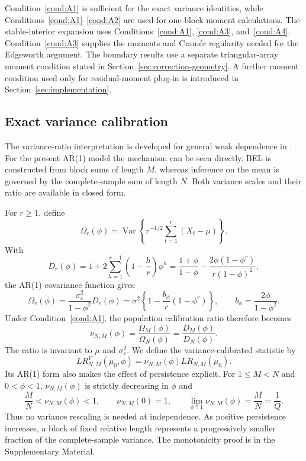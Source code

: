 \documentclass[12pt]{article}
\theoremstyle{remark}
\begin{document}
Condition~\ref{cond:A1} is sufficient for the exact variance identities, while Conditions~\ref{cond:A1}--\ref{cond:A2} are used for one-block moment calculations. The stable-interior expansion uses Conditions~\ref{cond:A1}, \ref{cond:A3}, and~\ref{cond:A4}. Condition~\ref{cond:A3} supplies the moments and Cram\'er regularity needed for the Edgeworth argument. The boundary results use a separate triangular-array moment condition stated in Section~\ref{sec:correction-geometry}. A further moment condition used only for residual-moment plug-in is introduced in Section~\ref{sec:implementation}.

\subsection{Exact variance calibration}
\label{sec:exact-vc}

The variance-ratio interpretation is developed for general weak dependence in \citet{Alksnis.Valeinis:2026}. For the present AR(1) model the mechanism can be seen directly. BEL is constructed from block sums of length $M$, whereas inference on the mean is governed by the complete-sample sum of length $N$. Both variance scales and their ratio are available in closed form.

For $r\ge1$, define
\[
\Omega_r(\phi)
=\operatorname{Var}\left\{r^{-1/2}\sum_{t=1}^r(X_t-\mu)\right\}.
\]
With
\[
D_r(\phi)
=1+2\sum_{h=1}^{r-1}\left(1-\frac{h}{r}\right)\phi^h
=\frac{1+\phi}{1-\phi}
-\frac{2\phi(1-\phi^r)}{r(1-\phi)^2},
\]
the AR(1) covariance function gives
\begin{equation}
\Omega_r(\phi)
=\frac{\sigma_\varepsilon^2}{1-\phi^2}D_r(\phi)
=\sigma^2\left\{1-\frac{b_\phi}{r}(1-\phi^r)\right\},
\qquad
b_\phi=\frac{2\phi}{1-\phi^2}.
\label{eq:Omega-r}
\end{equation}
Under Condition~\ref{cond:A1}, the population calibration ratio therefore becomes
\begin{equation}
\nu_{N,M}(\phi)
=\frac{\Omega_M(\phi)}{\Omega_N(\phi)}
=\frac{D_M(\phi)}{D_N(\phi)}.
\label{eq:nu-exact}
\end{equation}
The ratio is invariant to $\mu$ and $\sigma_\varepsilon^2$. We define the variance-calibrated statistic by
\[
LR^V_{N,M}(\mu_0,\phi)
=\nu_{N,M}(\phi)LR_{N,M}(\mu_0).
\]
Its AR(1) form also makes the effect of persistence explicit. For $1\le M<N$ and $0<\phi<1$, $\nu_{N,M}(\phi)$ is strictly decreasing in $\phi$ and
\[
\frac{M}{N}<\nu_{N,M}(\phi)<1,
\qquad
\nu_{N,M}(0)=1,
\qquad
\lim_{\phi\uparrow1}\nu_{N,M}(\phi)=\frac{M}{N}=\frac1Q.
\]
Thus no variance rescaling is needed at independence. As positive persistence increases, a block of fixed relative length represents a progressively smaller fraction of the complete-sample variance. The monotonicity proof is in the Supplementary Material.
\end{document}
